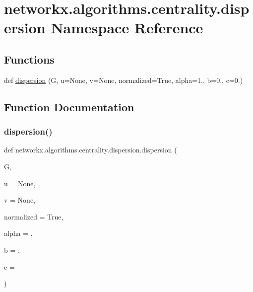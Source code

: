 \hypertarget{namespacenetworkx_1_1algorithms_1_1centrality_1_1dispersion}{}\section{networkx.\+algorithms.\+centrality.\+dispersion Namespace Reference}
\label{namespacenetworkx_1_1algorithms_1_1centrality_1_1dispersion}
\subsection*{Functions}
\begin{DoxyCompactItemize}
\item 
def \hyperlink{namespacenetworkx_1_1algorithms_1_1centrality_1_1dispersion_a5e58783535f5eac06c83fd634ec4ca9d}{dispersion} (G, u=None, v=None, normalized=True, alpha=1., b=0., c=0.)
\end{DoxyCompactItemize}


\subsection{Function Documentation}
\mbox{\label{namespacenetworkx_1_1algorithms_1_1centrality_1_1dispersion_a5e58783535f5eac06c83fd634ec4ca9d}} 
\subsubsection{\texorpdfstring{dispersion()}{dispersion()}}
{\footnotesize\ttfamily def networkx.\+algorithms.\+centrality.\+dispersion.\+dispersion (\begin{DoxyParamCaption}\item[{}]{G,  }\item[{}]{u = {\ttfamily None},  }\item[{}]{v = {\ttfamily None},  }\item[{}]{normalized = {\ttfamily True},  }\item[{}]{alpha = {},  }\item[{}]{b = {},  }\item[{}]{c = {} }\end{DoxyParamCaption})}

